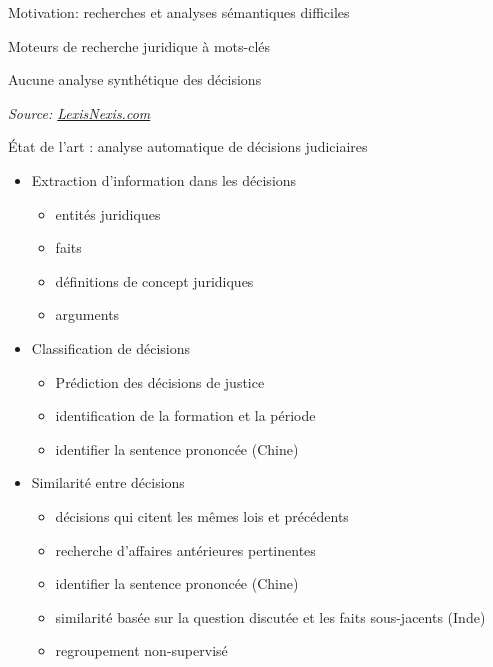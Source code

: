 \begin{frame}[t]{Motivation: recherches et analyses sémantiques difficiles}
	
	Moteurs de recherche juridique à mots-clés 
	
	Aucune analyse synthétique des décisions 
	
	
	\textit{\tiny{Source: \url{LexisNexis.com}}} 
\end{frame}

\begin{frame}[c]{État de l'art : analyse automatique de décisions judiciaires}
	\scriptsize
	\begin{itemize}
		\item Extraction d'information dans les décisions
		\begin{itemize}  \scriptsize
			\item entités juridiques \cite{Waltl2016lexia, andrew2018legalNerAndRelation}
			\item faits \cite{wyner2010extractlegalelts, wyner2010casefactors, Shulayeva2017recognfactprincip}
			\item définitions de concept juridiques \cite{Waltl2016lexia,waltl2017legaliegerman}
			\item arguments \cite{moens2007NBvsMaxent4arguments}
		\end{itemize}
		\item Classification de décisions
		\begin{itemize} \scriptsize
			\item Prédiction des décisions de justice \cite{Ashley2009classifCases, Aletras2016predictDecisionECHR}
			\item identification de la formation et la période \cite{Sulea2017predictareadecision,sulea2017legalEnsSVM}
			\item identifier la sentence prononcée (Chine) \cite{ma2018wmdchinesecase}
		\end{itemize}
		\item Similarité entre décisions 
		\begin{itemize}  \scriptsize
			\item décisions qui citent les mêmes lois et précédents \cite{nair2018judgsimassorule}
			\item recherche d'affaires antérieures pertinentes  \cite{thenmozhi2017legalprecedretriev}
			\item identifier la sentence prononcée (Chine) \cite{ma2018wmdchinesecase}
			\item similarité basée sur la question discutée et les faits sous-jacents (Inde) \cite{kumar2011judgmentsimilarity}
			\item regroupement non-supervisé \cite{raghuveer2012legalclusteringLDA}
		\end{itemize}
	\end{itemize}
\end{frame}


